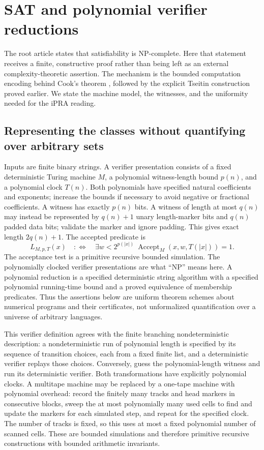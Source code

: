 \section{SAT and polynomial verifier reductions}\label{sec:complexity}

The root article states that satisfiability is NP-complete. Here that
statement receives a finite, constructive proof rather than being left as
an external complexity-theoretic assertion. The mechanism is the bounded
computation encoding behind Cook's theorem \cite{cook1971}, followed by the
explicit Tseitin construction proved earlier. We state the machine model,
the witnesses, and the uniformity needed for the iPRA reading.

\subsection{Representing the classes without quantifying over arbitrary sets}

Inputs are finite binary strings. A verifier presentation consists of a
fixed deterministic Turing machine $M$, a polynomial witness-length bound
$p(n)$, and a polynomial clock $T(n)$. Both polynomials have specified
natural coefficients and exponents; increase the bounds if necessary to
avoid negative or fractional coefficients. A witness has exactly $p(n)$
bits. A witness of length at most $q(n)$ may instead be represented by
$q(n)+1$ unary length-marker bits and $q(n)$ padded data bits; validate the
marker and ignore padding. This gives exact length $2q(n)+1$.
The accepted predicate is
\[
 L_{M,p,T}(x)\quad:\!\Longleftrightarrow\quad
 \exists w<2^{p(|x|)}\ \operatorname{Accept}_M(x,w,T(|x|))=1.
\]
The acceptance test is a primitive recursive bounded simulation. The
polynomially clocked verifier presentations are what ``NP'' means here.
A polynomial reduction is a specified deterministic string algorithm with
a specified polynomial running-time bound and a proved equivalence of
membership predicates. Thus the assertions below are uniform theorem
schemes about numerical programs and their certificates, not unformalized
quantification over a universe of arbitrary languages.

This verifier definition agrees with the finite branching nondeterministic
description: a nondeterministic run of polynomial length is specified by
its sequence of transition choices, each from a fixed finite list, and a
deterministic verifier replays those choices. Conversely, guess the
polynomial-length witness and run its deterministic verifier. Both
transformations have explicitly polynomial clocks. A multitape machine
may be replaced by a one-tape machine with polynomial overhead: record
the finitely many tracks and head markers in consecutive blocks, sweep
the at most polynomially many used cells to find and update the markers
for each simulated step, and repeat for the specified clock. The number
of tracks is fixed, so this uses at most a fixed polynomial number of
scanned cells. These are bounded simulations and therefore primitive
recursive constructions with bounded arithmetic invariants.

